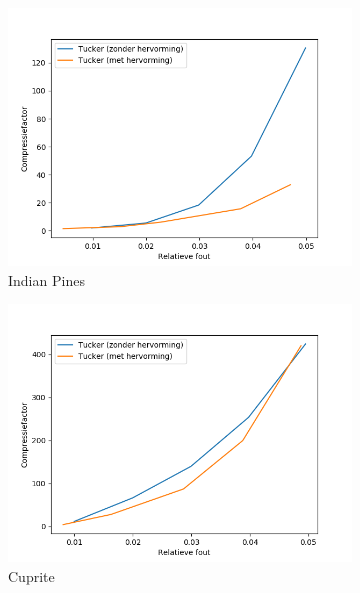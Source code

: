 \begin{figure}[H]
\centering
\begin{subfigure}{0.48\textwidth}
  \centering
  \includegraphics[width=\linewidth]{images/reshaped_tucker_st_hosvd_results_Indian_Pines.png}
  \caption{Indian Pines}
\end{subfigure}
\begin{subfigure}{0.48\textwidth}
  \centering
  \includegraphics[width=\linewidth]{images/reshaped_tucker_st_hosvd_results_Cuprite.png}
  \caption{Cuprite}
\end{subfigure}
\\
\begin{subfigure}{0.48\textwidth}
  \centering

\end{subfigure}
\end{figure}

